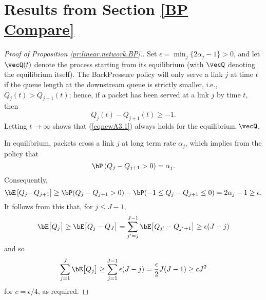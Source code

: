 \documentclass{amsart}
\begin{document}



\appendix 

\iffalse
\section{Results from Section \ref{BP Compare}}

\begin{proof}[Proof of Proposition \ref{pr:linear.network.BP}.]
Set $\epsilon=\min_{j} \{ 2\alpha_j-1\}>0$, and let $\vecQ(t)$ denote the process starting from its equilibrium (with $\vecQ$ denoting the equilibrium itself). 
The BackPressure policy will only serve a link $j$ at time $t$ if the queue length at the downstream queue is strictly smaller, i.e., $Q_{j}(t)>Q_{j+1}(t)$; hence, if a packet has been served at a link $j$ by time $t$, then
\begin{equation}
\label{eqnewA3.1}
Q_{j}(t) - Q_{j+1}(t) \geq -1.
\end{equation}
Letting $t\rightarrow\infty$ shows that (\ref{eqnewA3.1}) always holds for the equilibrium $\vecQ$.

In equilibrium, packets cross a link $j$ at long term rate $\alpha_j$, which implies from the policy that
\begin{equation*}
\bP \left( Q_{j} - Q_{j+1}> 0\right) = \alpha_{j}.
\end{equation*}
Consequently,
\begin{equation*}
\bE \left[ Q_{j}\!\! - Q_{j+1} \right] \geq \bP (Q_{j} - Q_{j+1}> 0) - \bP (-1 \leq Q_{j} - Q_{j+1} \leq 0)
=  2\alpha_{j} -1 \ge \epsilon.
\end{equation*}
It follows from this that, for $j\leq J-1$,
\begin{equation*}
\bE \big[ Q_{j} \big] \geq \bE \big[ Q_{j} - Q_{J} \big] = \sum_{j\rq{}=j}^{J-1} \bE \big[Q_{j\rq{}} - Q_{j\rq{}+1} \big] 
 \geq \epsilon(J-j)
\end{equation*}
and so
\begin{equation*}
 \sum_{j=1}^J \bE \big[  Q_{j} \big] \geq \sum_{j=1}^{J-1} \epsilon (J-j) =  \frac{\epsilon}{2}J(J-1) \ge cJ^2 
\end{equation*}
for $c = \epsilon/4 $, as required.
\end{proof}
\end{document}
